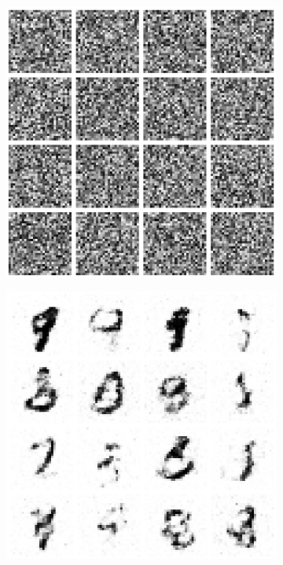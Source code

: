 \documentclass{article}
\begin{document}
\begin{figure}[t]
\begin{subfigure}{0.32\textwidth}
\end{subfigure}\\
\begin{subfigure}{0.32\textwidth}
\centering
\includegraphics[scale=0.2]{img/nf_noscale_sample_0}
\end{subfigure}
\begin{subfigure}{0.32\textwidth}
\centering
\includegraphics[scale=0.2]{img/nf_noscale_sample_20}
\end{subfigure}
\begin{subfigure}{0.32\textwidth}
\centering

\end{subfigure}
\end{figure}
\end{document}
